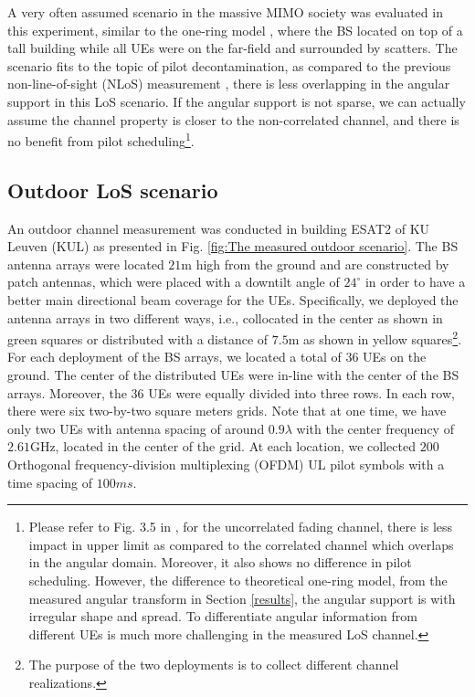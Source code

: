A very often assumed scenario in the massive MIMO society was evaluated in this experiment, similar to the one-ring model \cite{bjornson2017massive}, where the BS located on top of a tall building while all UEs were on the far-field and surrounded by scatters. The scenario fits to the topic of pilot decontamination, as compared to the previous  non-line-of-sight (NLoS) measurement \cite{Chen2018pilot}, there is less overlapping in the angular support in this LoS scenario. If the angular support is not sparse, we can actually assume the channel property is closer to the non-correlated channel, and there is no benefit from pilot scheduling\footnote{Please refer to Fig. 3.5 in \cite{bjornson2017massive}, for the uncorrelated fading channel,  there is less impact in upper limit as compared to the correlated channel which overlaps in the angular domain. Moreover, it also shows no difference in pilot scheduling. However, the difference to theoretical one-ring model, from the measured angular transform in Section \ref{results}, the angular support is with irregular shape and spread. To differentiate angular information from different UEs is much more challenging in the measured LoS channel.}.   
\subsection{Outdoor LoS scenario}
An outdoor channel measurement was conducted in building ESAT2 of KU Leuven (KUL) as presented in Fig. \ref{fig:The measured outdoor scenario}. The BS antenna arrays were located $21$m high from the ground and are constructed by patch antennas\cite{chen2017finite}, which were placed with a downtilt angle of $24^\circ$ in order to have a better main directional beam coverage for the UEs. Specifically, we deployed the antenna arrays in two different ways, i.e., collocated in the center as shown in green squares or distributed with a distance of $7.5$m as shown in yellow squares\footnote{The purpose of the two deployments is to collect different channel realizations.}. For each deployment of the BS arrays, we located a total of $36$ UEs on the ground. The center of the distributed UEs were in-line with the center of the BS arrays. Moreover, the $36$ UEs were equally divided into three rows. In each row, there were six two-by-two square meters grids. Note that at one time, we have only two UEs with antenna spacing of around $0.9\lambda$ with the center frequency of $2.61$GHz, located in the center of the grid. At each location, we collected $200$ Orthogonal frequency-division multiplexing (OFDM) UL pilot symbols with a time spacing of $100ms$.
